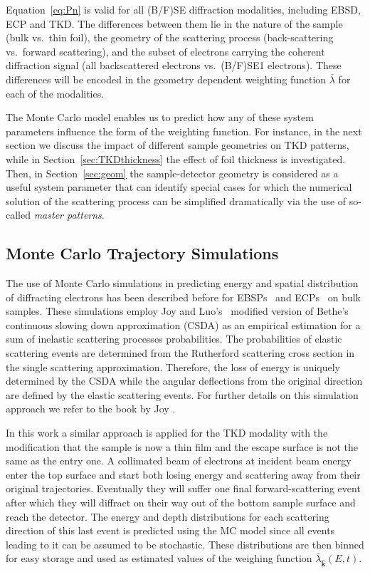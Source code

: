 Equation~\ref{eq:Pn} is valid for all (B/F)SE diffraction modalities, including EBSD, ECP and TKD. The differences between them lie in the nature of the sample (bulk vs.\ thin foil), the geometry of the scattering process (back-scattering vs.\ forward scattering), and the subset of electrons carrying the coherent diffraction signal (all backscattered electrons vs.\ (B/F)SE1 electrons). These differences will be encoded in the geometry dependent weighting function $\bar{\lambda}$ for each of the modalities. 

The Monte Carlo model enables us to predict how any of these system parameters influence the form of the weighting function. For instance, in the next section we discuss the impact of different sample geometries on TKD patterns, while in Section~\ref{sec:TKDthickness} the effect of foil thickness is investigated. Then, in Section~\ref{sec:geom} the sample-detector geometry is considered as a useful system parameter that can identify special cases for which the numerical solution of the scattering process can be simplified dramatically via the use of so-called \textit{master patterns}. 


\subsection{Monte Carlo Trajectory Simulations }
\label{sec:MC}
The use of Monte Carlo simulations in predicting energy and spatial distribution of diffracting electrons has been described before for EBSPs~\cite{degraef2013e} and ECPs~\cite{degraef2017k} on bulk samples. These simulations employ Joy and Luo's~\cite{Joy1989} modified version of Bethe's continuous slowing down approximation (CSDA) as an empirical estimation for a sum of inelastic scattering processes probabilities. The probabilities of elastic scattering events are determined from the Rutherford scattering cross section in the single scattering approximation. Therefore, the loss of energy is uniquely determined by the CSDA while the angular deflections from the original direction are defined by the elastic scattering events. For further details on this simulation approach we refer to the book by Joy \cite{joy1995a}. 

In this work a similar approach is applied for the TKD modality with the modification that the sample is now a thin film and the escape surface is not the same as the entry one. A collimated beam of electrons at incident beam energy enter the top surface and start both losing energy and scattering away from their original trajectories. Eventually they will suffer one final forward-scattering event after which they will diffract on their way out of the bottom sample surface and reach the detector. The energy and depth distributions for each scattering direction of this last event is predicted using the MC model since all events leading to it can be assumed to be stochastic. These distributions are then binned for easy storage and used as estimated values of the weighing function $\bar{\lambda}_{\hat{\mathbf{k}}}(E,t)$.


